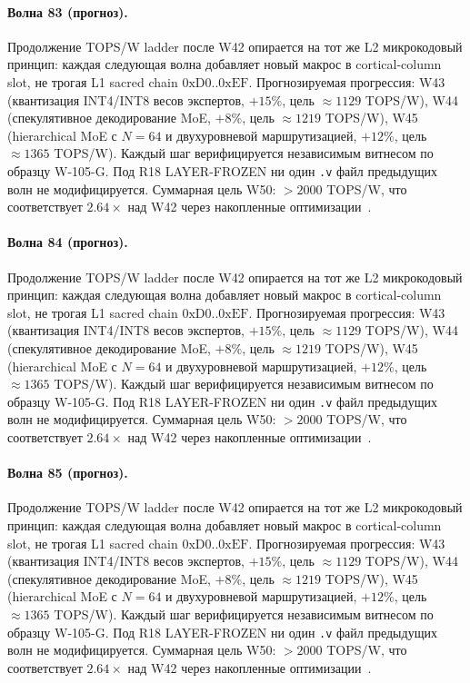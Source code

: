 \paragraph{Волна 83 (прогноз).} Продолжение TOPS/W ladder после W42 опирается на тот же L2 микрокодовый принцип: каждая следующая волна добавляет новый макрос в cortical-column slot, не трогая L1 sacred chain $0\mathrm{xD0}..0\mathrm{xEF}$. Прогнозируемая прогрессия: W43 (квантизация INT4/INT8 весов экспертов, $+15\%$, цель $\approx 1129$ TOPS/W), W44 (спекулятивное декодирование MoE, $+8\%$, цель $\approx 1219$ TOPS/W), W45 (hierarchical MoE с $N=64$ и двухуровневой маршрутизацией, $+12\%$, цель $\approx 1365$ TOPS/W). Каждый шаг верифицируется независимым витнесом по образцу W-105-G. Под R18 LAYER-FROZEN ни один \texttt{.v} файл предыдущих волн не модифицируется. Суммарная цель W50: $> 2000$ TOPS/W, что соответствует $2{.}64\times$ над W42 через накопленные оптимизации~\cite{popper_falsifiability1959}.

\paragraph{Волна 84 (прогноз).} Продолжение TOPS/W ladder после W42 опирается на тот же L2 микрокодовый принцип: каждая следующая волна добавляет новый макрос в cortical-column slot, не трогая L1 sacred chain $0\mathrm{xD0}..0\mathrm{xEF}$. Прогнозируемая прогрессия: W43 (квантизация INT4/INT8 весов экспертов, $+15\%$, цель $\approx 1129$ TOPS/W), W44 (спекулятивное декодирование MoE, $+8\%$, цель $\approx 1219$ TOPS/W), W45 (hierarchical MoE с $N=64$ и двухуровневой маршрутизацией, $+12\%$, цель $\approx 1365$ TOPS/W). Каждый шаг верифицируется независимым витнесом по образцу W-105-G. Под R18 LAYER-FROZEN ни один \texttt{.v} файл предыдущих волн не модифицируется. Суммарная цель W50: $> 2000$ TOPS/W, что соответствует $2{.}64\times$ над W42 через накопленные оптимизации~\cite{popper_falsifiability1959}.

\paragraph{Волна 85 (прогноз).} Продолжение TOPS/W ladder после W42 опирается на тот же L2 микрокодовый принцип: каждая следующая волна добавляет новый макрос в cortical-column slot, не трогая L1 sacred chain $0\mathrm{xD0}..0\mathrm{xEF}$. Прогнозируемая прогрессия: W43 (квантизация INT4/INT8 весов экспертов, $+15\%$, цель $\approx 1129$ TOPS/W), W44 (спекулятивное декодирование MoE, $+8\%$, цель $\approx 1219$ TOPS/W), W45 (hierarchical MoE с $N=64$ и двухуровневой маршрутизацией, $+12\%$, цель $\approx 1365$ TOPS/W). Каждый шаг верифицируется независимым витнесом по образцу W-105-G. Под R18 LAYER-FROZEN ни один \texttt{.v} файл предыдущих волн не модифицируется. Суммарная цель W50: $> 2000$ TOPS/W, что соответствует $2{.}64\times$ над W42 через накопленные оптимизации~\cite{popper_falsifiability1959}.

